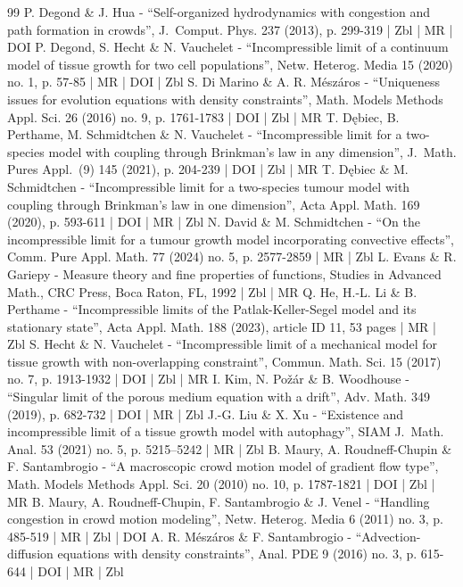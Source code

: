 \begin{thebibliography}{99}
P. Degond \& J. Hua - “Self-organized hydrodynamics with congestion and path formation in crowds”, J. Comput. Phys. 237 (2013), p. 299-319 | Zbl | MR | DOI
P. Degond, S. Hecht \& N. Vauchelet - “Incompressible limit of a continuum model of tissue growth for two cell populations”, Netw. Heterog. Media 15 (2020) no. 1, p. 57-85 | MR | DOI | Zbl
S. Di Marino \& A. R. Mészáros - “Uniqueness issues for evolution equations with density constraints”, Math. Models Methods Appl. Sci. 26 (2016) no. 9, p. 1761-1783 | DOI | Zbl | MR
T. Dębiec, B. Perthame, M. Schmidtchen \& N. Vauchelet - “Incompressible limit for a two-species model with coupling through Brinkman’s law in any dimension”, J. Math. Pures Appl. (9) 145 (2021), p. 204-239 | DOI | Zbl | MR
T. Dębiec \& M. Schmidtchen - “Incompressible limit for a two-species tumour model with coupling through Brinkman’s law in one dimension”, Acta Appl. Math. 169 (2020), p. 593-611 | DOI | MR | Zbl
N. David \& M. Schmidtchen - “On the incompressible limit for a tumour growth model incorporating convective effects”, Comm. Pure Appl. Math. 77 (2024) no. 5, p. 2577-2859 | MR | Zbl
L. Evans \& R. Gariepy - Measure theory and fine properties of functions, Studies in Advanced Math., CRC Press, Boca Raton, FL, 1992 | Zbl | MR
Q. He, H.-L. Li \& B. Perthame - “Incompressible limits of the Patlak-Keller-Segel model and its stationary state”, Acta Appl. Math. 188 (2023), article ID 11, 53 pages | MR | Zbl
S. Hecht \& N. Vauchelet - “Incompressible limit of a mechanical model for tissue growth with non-overlapping constraint”, Commun. Math. Sci. 15 (2017) no. 7, p. 1913-1932 | DOI | Zbl | MR
I. Kim, N. Požár \& B. Woodhouse - “Singular limit of the porous medium equation with a drift”, Adv. Math. 349 (2019), p. 682-732 | DOI | MR | Zbl
J.-G. Liu \& X. Xu - “Existence and incompressible limit of a tissue growth model with autophagy”, SIAM J. Math. Anal. 53 (2021) no. 5, p. 5215–5242 | MR | Zbl
B. Maury, A. Roudneff-Chupin \& F. Santambrogio - “A macroscopic crowd motion model of gradient flow type”, Math. Models Methods Appl. Sci. 20 (2010) no. 10, p. 1787-1821 | DOI | Zbl | MR
B. Maury, A. Roudneff-Chupin, F. Santambrogio \& J. Venel - “Handling congestion in crowd motion modeling”, Netw. Heterog. Media 6 (2011) no. 3, p. 485-519 | MR | Zbl | DOI
A. R. Mészáros \& F. Santambrogio - “Advection-diffusion equations with density constraints”, Anal. PDE 9 (2016) no. 3, p. 615-644 | DOI | MR | Zbl

\end{thebibliography}
